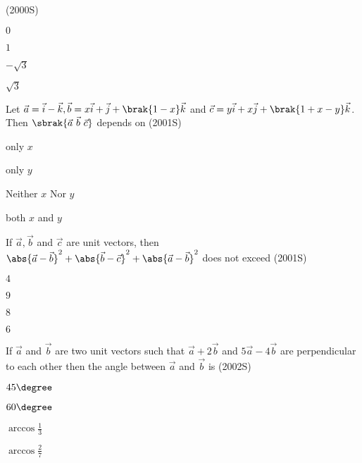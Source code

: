 \hfill (2000S)
\begin{enumerate}
\begin{multicols}{4}
    \item $0$
    \item $1$
    \item $-\sqrt{3}$
    \item $\sqrt{3}$
\end{multicols}
\end{enumerate}
\item Let $\vec{a}= \vec{i}-\vec{k},\vec{b}=x\vec{i}+\vec{j}+\brak{1-x}\vec{k}$ and $\vec{c}= y\vec{i}+x\vec{j}+\brak{1+x-y}\vec{k}$. Then $\sbrak{\vec{a} \ \vec{b} \ \vec{c}}$ depends on 
\hfill (2001S)
\begin{enumerate}
\begin{multicols}{1}
\item only $x$
\item only $y$
\item Neither $x$ Nor $y$
\item both $x$ and $y$
\end{multicols}
\end{enumerate}
\item If $\vec{a},\vec{b}$ and $\vec{c}$ are unit vectors, then \\
$\abs{\vec{a}-\vec{b}}^2+\abs{\vec{b}-\vec{c}}^2+\abs{\vec{a}-\vec{b}}^2$ does not exceed 
\hfill (2001S)
\begin{enumerate}
\begin{multicols}{4}
    \item $4$
    \item $9$
    \item $8$
    \item $6$
\end{multicols}
\end{enumerate}
\item If $\vec{a}$ and $\vec{b}$ are two unit vectors such that $\vec{a}+2\vec{b}$ and $5\vec{a}-4\vec{b}$ are perpendicular to each other then the angle between $\vec{a}$ and $\vec{b}$ is 
\hfill (2002S)
\begin{enumerate}
\begin{multicols}{2}
    \item $45\degree$
    \item $60\degree$
    \item $\arccos{\frac{1}{3}}$
    \item $\arccos{\frac{2}{7}}$
\end{multicols}
\end{enumerate}

